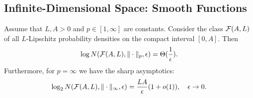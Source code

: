 \begin{remark}
    \cite{artstein2004duality}
\end{remark}


\subsection{Infinite-Dimensional Space: Smooth Functions}

\begin{theorem}
    Assume that $L,A>0$ and $p\in [1,\infty]$ are constants.
    Consider the class $\mathcal{F}(A,L)$ of all $L$-Lipschitz probability densities on the compact interval $[0,A]$.
    Then 
    \[\log N(\mathcal{F}(A,L),\|\cdot\|_p,\epsilon)=\Theta(\frac{1}{\epsilon}).\]
    Furthermore, for $p=\infty$ we have the sharp asymptotics:
    \[\log_2 N(\mathcal{F}(A,L),\|\cdot\|_\infty,\epsilon)=\frac{LA}{\epsilon}(1+o(1)),\quad\epsilon\to 0.\]
\end{theorem}
